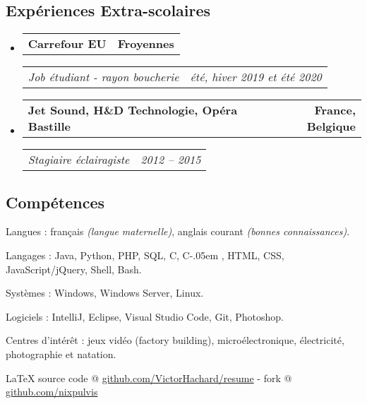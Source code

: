 \documentclass[10pt,a4paper]{article}
\makeatletter
\newcommand{\Csharp}{%
  {\settoheight{\dimen0}{C}C\kern-.05em \resizebox{!}{\dimen0}{\raisebox{\depth}{\#}}}}
\newcommand{\latex}{\LaTeX\xspace}
\newenvironment{indentsection}[1]
{\begin{list}{}
  {\setlength{\leftmargin}{#1}} \item[]
}
{\end{list}}
\newcommand{\headerrow}[2]
{\begin{tabular*}{\linewidth}{l@{\extracolsep{\fill}}r}
  #1 &
  #2 \\
\end{tabular*}}
\makeatother
\begin{document}
\vspace{-0.4em}
\subsection*{Expériences Extra-scolaires}
\begin{itemize}
  \parskip=0.1em

  \item
  \headerrow
    {\textbf{Carrefour EU}}
    {\textbf{Froyennes}}
  \headerrow
    {\emph{Job étudiant - rayon boucherie}}
    {\emph{été, hiver 2019 et été 2020}}
  \item
  \headerrow
    {\textbf{Jet Sound, H\&D Technologie, Opéra Bastille}}
    {\textbf{France, Belgique}}
  \headerrow
    {\emph{Stagiaire éclairagiste}}
    {\emph{2012 -- 2015}}
\end{itemize}


\vspace{-0.4em}
\subsection*{Compétences}
\begin{indentsection}{\parindent}
\begin{description*}
  \item[Langues :]
  français \emph{(langue maternelle)}, %
  anglais courant \emph{(bonnes connaissances)}.
 \item[Langages :] Java, Python, PHP, SQL, C, \Csharp, HTML,
  CSS,  JavaScript/jQuery, Shell, Bash.
  \item[Systèmes :] Windows, Windows Server, Linux.
  \item[Logiciels :] IntelliJ, Eclipse, Visual Studio Code, Git, Photoshop.
\end{description*}
\end{indentsection}


\begin{indentsection}{\parindent}
\begin{description*}
\item[Centres d'intérêt :]
  jeux vidéo (factory building), microélectronique,
  électricité, photographie et natation.
\end{description*}
\end{indentsection}


\begin{center}
\footnotesize \latex source code @
\href{http://www.github.com/VictorHachard/resume}
{github.com/VictorHachard/resume} - fork @
\href{http://www.github.com/nixpulvis}
{github.com/nixpulvis} \\
\end{center}
\end{document}
